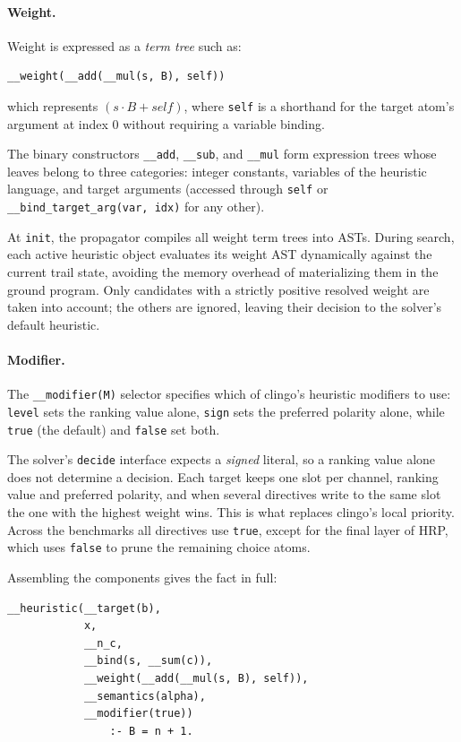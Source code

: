 \paragraph{Weight.} Weight is expressed as a \emph{term tree} such as:
\begin{verbatim}
__weight(__add(__mul(s, B), self))
\end{verbatim}
which represents $(s \cdot B + \mathit{self})$, where \texttt{self} is a shorthand for the target atom's argument at index 0 without requiring a variable binding.

The binary constructors \texttt{\_\_add}, \texttt{\_\_sub}, and \texttt{\_\_mul} form expression trees whose leaves belong to three categories: integer constants, variables of the heuristic language, and target arguments (accessed through \texttt{self} or \texttt{\_\_bind\_target\_arg(var, idx)} for any other).

At \texttt{init}, the propagator compiles all weight term trees into ASTs. During search, each active heuristic object evaluates its weight AST dynamically against the current trail state, avoiding the memory overhead of materializing them in the ground program. Only candidates with a strictly positive resolved weight are taken into account; the others are ignored, leaving their decision to the solver's default heuristic.

\paragraph{Modifier.} The \texttt{\_\_modifier(M)} selector specifies which of clingo's heuristic modifiers to use: \texttt{level} sets the ranking value alone, \texttt{sign} sets the preferred polarity alone, while \texttt{true} (the default) and \texttt{false} set both. 

The solver's \texttt{decide} interface expects a \emph{signed} literal, so a ranking value alone does not determine a decision. Each target keeps one slot per channel, ranking value and preferred polarity, and when several directives write to the same slot the one with the highest weight wins. This is what replaces clingo's local priority. Across the benchmarks all directives use \texttt{true}, except for the final layer of HRP, which uses \texttt{false} to prune the remaining choice atoms.

\medskip
Assembling the components gives the fact in full:

\begin{verbatim}
__heuristic(__target(b), 
            x, 
            __n_c, 
            __bind(s, __sum(c)), 
            __weight(__add(__mul(s, B), self)), 
            __semantics(alpha), 
            __modifier(true)) 
                :- B = n + 1.
\end{verbatim}


